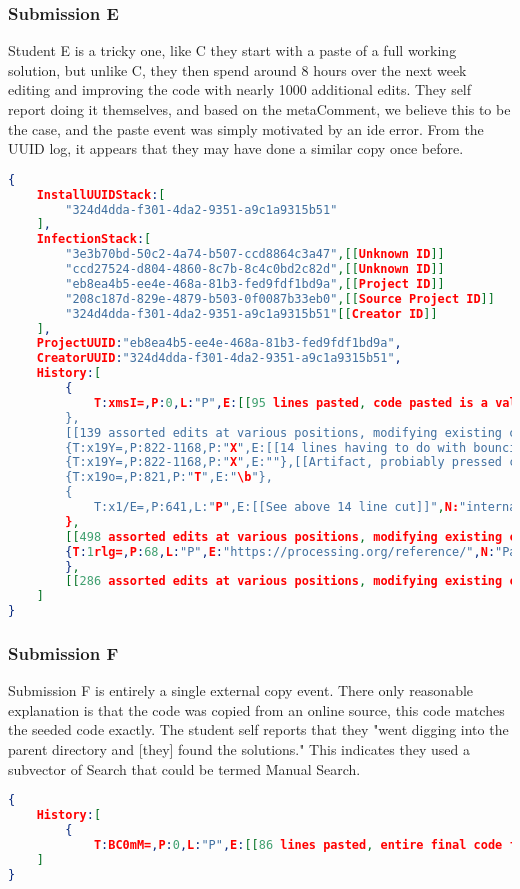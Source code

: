 \documentclass[conference]{IEEEtran}
\newcommand{\metaComment}{metaComment\xspace}
\begin{document}
\subsubsection*{Submission E}
Student E is a tricky one, like C they start with a paste of a full working solution, but unlike C, they then spend around 8 hours over the next week editing and improving the code with nearly 1000 additional edits.  They self report doing it themselves, and based on the \metaComment, we believe this to be the case, and the paste event was simply motivated by an ide error.  From the UUID log, it appears that they may have done a similar copy once before.
\begin{lstlisting}[language=json]
{
	InstallUUIDStack:[
		"324d4dda-f301-4da2-9351-a9c1a9315b51"
	],
	InfectionStack:[
		"3e3b70bd-50c2-4a74-b507-ccd8864c3a47",[[Unknown ID]]
		"ccd27524-d804-4860-8c7b-8c4c0bd2c82d",[[Unknown ID]]
		"eb8ea4b5-ee4e-468a-81b3-fed9fdf1bd9a",[[Project ID]]
		"208c187d-829e-4879-b503-0f0087b33eb0",[[Source Project ID]]
		"324d4dda-f301-4da2-9351-a9c1a9315b51"[[Creator ID]]
	],
	ProjectUUID:"eb8ea4b5-ee4e-468a-81b3-fed9fdf1bd9a",
	CreatorUUID:"324d4dda-f301-4da2-9351-a9c1a9315b51",
	History:[
		{
			T:xmsI=,P:0,L:"P",E:[[95 lines pasted, code pasted is a valid solution, but not the final]]}",N:"paste from project with same creator;Paste from project with UUID 208c187d-829e-4879-b503-0f0087b33eb0;"
		},
		[[139 assorted edits at various positions, modifying existing code, and adding new code/comments, no copies or pastes]]
		{T:x19Y=,P:822-1168,P:"X",E:[[14 lines having to do with bouncing]]},
		{T:x19Y=,P:822-1168,P:"X",E:""},[[Artifact, probiably pressed ctrl X twice]]
		{T:x19o=,P:821,P:"T",E:"\b"},
		{
			T:x1/E=,P:641,L:"P",E:[[See above 14 line cut]]",N:"internal paste;"
		},
		[[498 assorted edits at various positions, modifying existing code, and adding new code/comments including many short interal copy paste]]
		{T:1rlg=,P:68,L:"P",E:"https://processing.org/reference/",N:"Paste from noncoded source"[[copied URL from browser in comment]]
		},
		[[286 assorted edits at various positions, modifying existing code, and adding new code/comments including many short interal copy paste]]
	]
}
\end{lstlisting}
\subsubsection*{Submission F}
Submission F is entirely a single external copy event.  There only reasonable explanation is that the code was copied from an online source, this code matches the seeded code exactly.  The student self reports that they "went digging into the parent directory and [they] found the solutions."  This indicates they used a subvector of Search that could be termed Manual Search.
\begin{lstlisting}[language=json]
{
	History:[
		{
			T:BC0mM=,P:0,L:"P",E:[[86 lines pasted, entire final code file]],N:"Paste from noncoded source"}
	]
}
\end{lstlisting}
\end{document}
